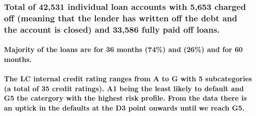 \documentclass[
]{article}
\begin{document}
\hypertarget{total-of-42531-individual-loan-accounts-with-5653-charged-off-meaning-that-the-lender-has-written-off-the-debt-and-the-account-is-closed-and-33586-fully-paid-off-loans.}{%
\subsubsection{Total of 42,531 individual loan accounts with 5,653
charged off (meaning that the lender has written off the debt and the
account is closed) and 33,586 fully paid off
loans.}\label{total-of-42531-individual-loan-accounts-with-5653-charged-off-meaning-that-the-lender-has-written-off-the-debt-and-the-account-is-closed-and-33586-fully-paid-off-loans.}}

\hypertarget{majority-of-the-loans-are-for-36-months-74-and-26-and-for-60-months.}{%
\paragraph{Majority of the loans are for 36 months (74\%) and (26\%) and
for 60
months.}\label{majority-of-the-loans-are-for-36-months-74-and-26-and-for-60-months.}}

\hypertarget{the-lc-internal-credit-rating-ranges-from-a-to-g-with-5-subcategories-a-total-of-35-credit-ratings.-a1-being-the-least-likely-to-default-and-g5-the-catergory-with-the-highest-risk-profile.-from-the-data-there-is-an-uptick-in-the-defaults-at-the-d3-point-onwards-until-we-reach-g5.}{%
\paragraph{The LC internal credit rating ranges from A to G with 5
subcategories (a total of 35 credit ratings). A1 being the least likely
to default and G5 the catergory with the highest risk profile. From the
data there is an uptick in the defaults at the D3 point onwards until we
reach
G5.}\label{the-lc-internal-credit-rating-ranges-from-a-to-g-with-5-subcategories-a-total-of-35-credit-ratings.-a1-being-the-least-likely-to-default-and-g5-the-catergory-with-the-highest-risk-profile.-from-the-data-there-is-an-uptick-in-the-defaults-at-the-d3-point-onwards-until-we-reach-g5.}}
\end{document}
